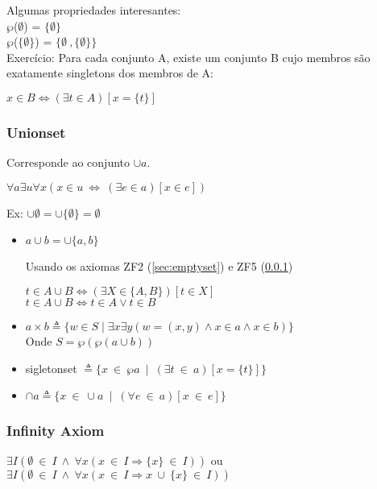 \documentclass[12pt, a4paper]{article}
\begin{document}
				Algumas propriedades interesantes:\\
				$\wp$($\emptyset$) = $\{ \emptyset \}$ \\
				$\wp$($\{ \emptyset \} $) = $\{ \emptyset \ , \{ \emptyset \}\}$\\

				Exerc\'icio: Para cada conjunto A, existe um conjunto B cujo membros s\~ao exatamente singletons dos membros de A:
				\begin{center}
				$ x \in B \Leftrightarrow (\exists t \in A) [x = \{t\}]$
				\end{center}
			\subsubsection{Unionset}
			\label{sec:unionset}
				Corresponde ao conjunto $\cup a$.\\
				\begin{center}
				$\forall a \exists u \forall x ( x \in u ~\Leftrightarrow~ (\exists e \in a) [x \in e] )$
				\end{center}

				Ex: $\cup \emptyset = \cup \{ \emptyset \} = \emptyset$

				\begin{itemize}
				\item $a \cup b = \cup \{a,b\}$
				
				Usando os axiomas ZF2 (\ref{sec:emptyset}) e ZF5 (\ref{sec:unionset})\\
				\begin{center}
				$t \in A \cup B \Leftrightarrow (\exists X \in \{A,B\})[t \in X]$\\
				$t \in A \cup B \Leftrightarrow t \in A \vee t \in B$
				\end{center}
				\item $ a \times b \triangleq \{ w \in S \mid \exists x \exists y (w = (x,y) \land x \in a \land x \in b)\}$ \\
						Onde $S = \wp(\wp(a \cup b))$
				\item sigletonset $ \triangleq \{ x ~ \in ~ \wp a ~\mid~ (\exists t ~\in~ a)[x = \{t\}]\}$
				\item $\cap a \triangleq \{x ~\in~ \cup a ~\mid~ (\forall e ~\in~ a)[x ~\in~ e]\}$
				\end{itemize}

			\subsubsection{Infinity Axiom}
			\label{sec:infinity}
				$\exists I (\emptyset ~\in~ I ~\land~ \forall x (x ~\in~ I \Rightarrow \{x\} ~\in~ I ))$ ou\\
				$\exists I (\emptyset ~\in~ I ~\land~ \forall x (x ~\in~ I \Rightarrow x ~\cup~ \{x\} ~\in~ I ))$\\
\end{document}

